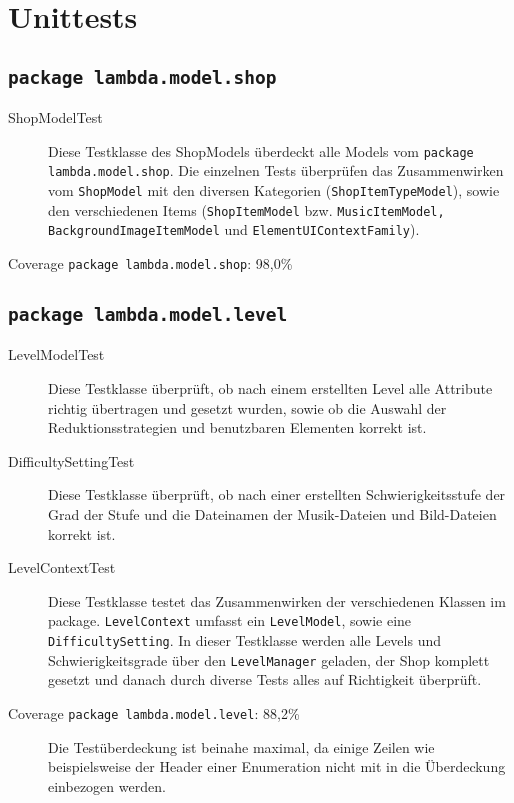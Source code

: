 \section{Unittests}
\subsection{\texttt{package lambda.model.shop}}

\begin{description}
\item[ShopModelTest] Diese Testklasse des ShopModels überdeckt alle Models vom \texttt{package lambda.model.shop}.
Die einzelnen Tests überprüfen das Zusammenwirken vom \texttt{ShopModel} mit den diversen Kategorien (\texttt{ShopItemTypeModel}), sowie den verschiedenen Items (\texttt{ShopItemModel} bzw. \texttt{MusicItemModel, BackgroundImageItemModel} und \texttt{ElementUIContextFamily}).

\item[Coverage \texttt{package lambda.model.shop}: 98,0\%]
\end{description}

\subsection{\texttt{package lambda.model.level}}
\begin{description}
\item[LevelModelTest] Diese Testklasse überprüft, ob nach einem erstellten Level alle Attribute richtig übertragen und gesetzt wurden, sowie ob die Auswahl der Reduktionsstrategien und benutzbaren Elementen korrekt ist.

\item[DifficultySettingTest] Diese Testklasse überprüft, ob nach einer erstellten Schwierigkeitsstufe der Grad der Stufe und die Dateinamen der Musik-Dateien und Bild-Dateien korrekt ist.

\item[LevelContextTest] Diese Testklasse testet das Zusammenwirken der verschiedenen Klassen im package. \texttt{LevelContext} umfasst ein \texttt{LevelModel}, sowie eine \texttt{DifficultySetting}. In dieser Testklasse werden alle Levels und Schwierigkeitsgrade über den \texttt{LevelManager} geladen, der Shop komplett gesetzt und danach durch diverse Tests alles auf Richtigkeit überprüft.

\item[Coverage \texttt{package lambda.model.level}: 88,2\%] Die Testüberdeckung ist beinahe maximal, da einige Zeilen wie beispielsweise der Header einer Enumeration nicht mit in die Überdeckung einbezogen werden.
\end{description}


